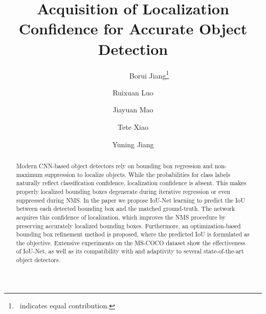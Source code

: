\documentclass[runningheads]{llncs}
\begin{document}
\title{Acquisition of Localization Confidence for Accurate Object Detection}
\author{
  ~~~~~~~~~Borui Jiang\thanks{~indicates equal contribution.} \and
  Ruixuan Luo \and
  Jiayuan Mao \and \newline
  Tete Xiao \and
  Yuning Jiang
}

\maketitle
\begin{abstract}
Modern CNN-based object detectors rely on bounding box regression and non-maximum suppression to localize objects. While the probabilities for class labels naturally reflect classification confidence, localization confidence is absent. This makes properly localized bounding boxes degenerate during iterative regression or even suppressed during NMS. In the paper we propose IoU-Net learning to predict the IoU between each detected bounding box and the matched ground-truth. The network acquires this confidence of localization, which improves the NMS procedure by preserving accurately localized bounding boxes. Furthermore, an optimization-based bounding box refinement method is proposed, where the predicted IoU is formulated as the objective. Extensive experiments on the MS-COCO dataset show the effectiveness of IoU-Net, as well as its compatibility with and adaptivity to several state-of-the-art object detectors.
\end{abstract}
\end{document}
